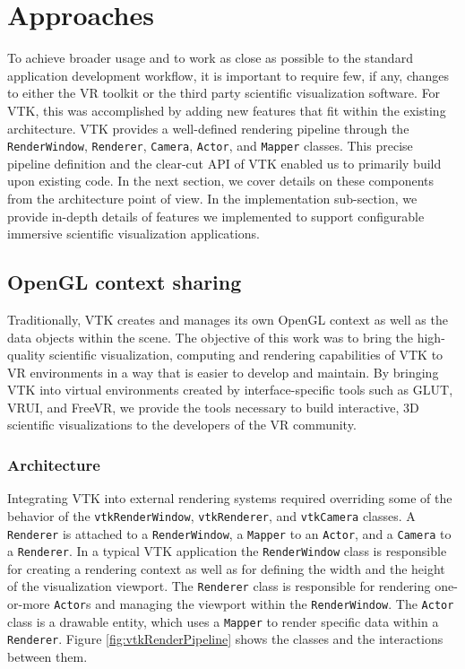 \section{Approaches}

To achieve broader usage and to work as close as possible to the standard application development workflow, it is important to require few, if any, changes to either the VR toolkit or the third party scientific visualization software.
For VTK, this was accomplished by adding new features that fit within the existing architecture. 
VTK provides a well-defined rendering pipeline through the \texttt{RenderWindow}, \texttt{Renderer}, \texttt{Camera}, \texttt{Actor}, and \texttt{Mapper} classes.
This precise pipeline definition and the clear-cut API of VTK enabled us to primarily build upon
existing code.
In the next section, we cover details on these components from the architecture point of view.
In the implementation sub-section, we provide in-depth details of features we implemented to support configurable immersive scientific visualization applications. 

\subsection{OpenGL context sharing}

Traditionally, VTK creates and manages its own OpenGL context as well as the data objects within the scene.
The objective of this work was to bring the high-quality scientific visualization, computing and rendering capabilities of VTK to VR environments in a way that is easier to develop and maintain.
By bringing VTK into virtual environments created by interface-specific tools such as GLUT, VRUI, and FreeVR, we provide the tools necessary to build interactive, 3D scientific visualizations to the developers of the VR community.

\subsubsection{Architecture}

Integrating VTK into external rendering systems required overriding some of the behavior of the \texttt{vtkRenderWindow}, \texttt{vtkRenderer}, and \texttt{vtkCamera} classes.
A \texttt{Renderer} is attached to a \texttt{RenderWindow}, a \texttt{Mapper} to an \texttt{Actor}, and a \texttt{Camera} to a \texttt{Renderer}.
In a typical VTK application the \texttt{RenderWindow} class is responsible for creating a rendering context as well as for defining the width and the height of the visualization viewport.
The \texttt{Renderer} class is responsible for rendering one-or-more
\texttt{Actor}s and managing the viewport within the \texttt{RenderWindow}.
The \texttt{Actor} class is a drawable entity, which uses a \texttt{Mapper} to render specific data within a \texttt{Renderer}.
Figure \ref{fig:vtkRenderPipeline} shows the classes and the interactions between them.

